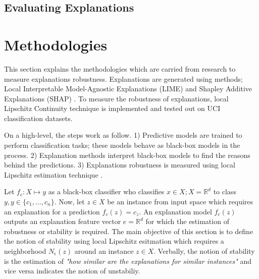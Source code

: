 \documentclass[english]{tktltiki2}
\theoremstyle{definition}
\theoremstyle{remark}
\begin{document}
\subsection{Evaluating Explanations} %

\section{Methodologies}\label{sec:methodologies} %
This section explains the methodologies which are carried from research to measure explanations robustness. Explanations are generated using methods; Local Interpretable Model-Agnostic Explanations (LIME) and Shapley Additive Explanations (SHAP) \citep{ribeiro2016should,lundberg2017unified}. To measure the robustness of explanations, local Lipschitz Continuity technique \citep{alvarez2018robustness} is implemented and tested out on UCI classification datasets.

On a high-level, the steps work as follow. 1) Predictive models are trained to perform classification tasks; these models behave as black-box models in the process. 2) Explanation methods interpret black-box models to find the reasons behind the predictions. 3) Explanations robustness is measured using local Lipschitz estimation technique \citep{alvarez2018robustness}.

Let $f_c: X \mapsto y$ as a black-box classifier who classifies $x \in X; X = {\mathbb{R}}^d$ to class $y, y \in \{c_1, \dots, c_n\}$. Now, let $z \in X$ be an instance from input space which requires an explanation for a prediction $f_c(z) = c_z$. An explanation model $f_e(z)$ outputs an explanation feature vector $ e = {\mathbb{R}}^d$ for which the estimation of robustness or stability is required. The main objective of this section is to define the notion of stability using local Lipschitz esitmation which requires a neighborhood $N_{\epsilon}(z)$ around an instance $z \in X$. Verbally, the notion of stability is the estimation of \textit{"how similar are the explanations for similar instances"} and vice versa indicates the notion of unstabiliy.
\end{document}
